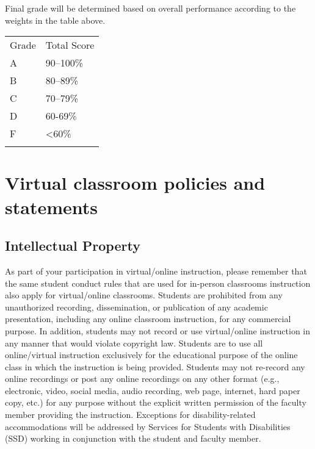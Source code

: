 Final grade will be determined based on overall performance according to
the weights in the table above.

\begin{longtable}[]{@{}ll@{}}
\toprule
Grade & Total Score \\ \addlinespace
\midrule
\endhead
A & 90--100\% \\ \addlinespace
B & 80--89\% \\ \addlinespace
C & 70--79\% \\ \addlinespace
D & 60-69\% \\ \addlinespace
F & \textless60\% \\ \addlinespace
\bottomrule
\end{longtable}

\hypertarget{virtual-classroom-policies-and-statements}{%
\section{Virtual classroom policies and
statements}\label{virtual-classroom-policies-and-statements}}

\hypertarget{intellectual-property}{%
\subsection{Intellectual Property}\label{intellectual-property}}

As part of your participation in virtual/online instruction, please
remember that the same student conduct rules that are used for in-person
classrooms instruction also apply for virtual/online classrooms.
Students are prohibited from any unauthorized recording, dissemination,
or publication of any academic presentation, including any online
classroom instruction, for any commercial purpose. In addition, students
may not record or use virtual/online instruction in any manner that
would violate copyright law. Students are to use all online/virtual
instruction exclusively for the educational purpose of the online class
in which the instruction is being provided. Students may not re-record
any online recordings or post any online recordings on any other format
(e.g., electronic, video, social media, audio recording, web page,
internet, hard paper copy, etc.) for any purpose without the explicit
written permission of the faculty member providing the instruction.
Exceptions for disability-related accommodations will be addressed by
Services for Students with Disabilities (SSD) working in conjunction
with the student and faculty member.

